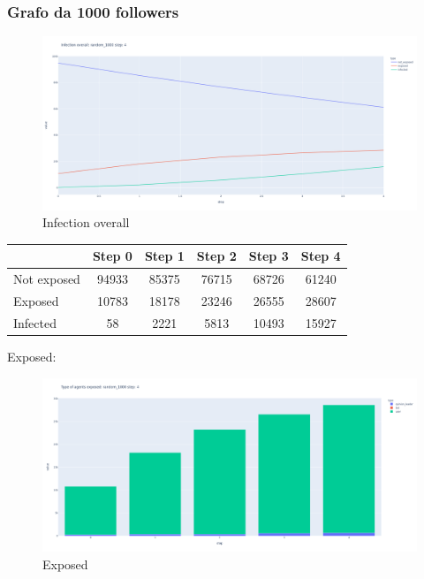           
          
          
    \subsubsection{Grafo da 1000 followers}
    
        \begin{figure}[H]
            \includegraphics[width=16cm]{resources/charts/random_1000_line.png}
            \caption{Infection overall}
            \label{fig:random_1000_line}
        \end{figure}
        
        \begin{table}[H]
            \centering
            \begin{tabular}{|l|c|c|c|c|c|}
            \hline
                        & Step 0 & Step 1 & Step 2 & Step 3 & Step 4 \\ \hline
            Not exposed & 94933  & 85375  & 76715  & 68726  & 61240  \\ \hline
            Exposed     & 10783  & 18178  & 23246  & 26555  & 28607  \\ \hline
            Infected    & 58     & 2221   & 5813   & 10493  & 15927  \\ \hline
            \end{tabular}
        \end{table}
        
        Exposed:
        \begin{figure}[H]
            \includegraphics[width=16cm]{resources/charts/random_1000_bar.png}
            \caption{Exposed}
            \label{fig:random_1000_bar}
        \end{figure}
        
